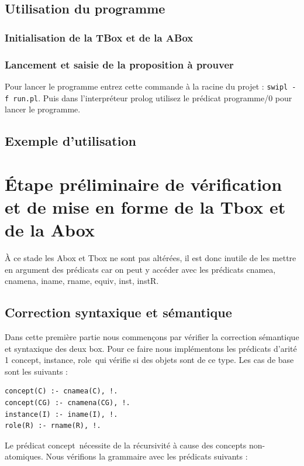 \documentclass{article}
\begin{document}
\subsection{Utilisation du programme}
\subsubsection{Initialisation de la TBox et de la ABox}

\subsubsection{Lancement et saisie de la proposition à prouver}
Pour lancer le programme entrez cette commande à la racine du projet : \verb|swipl -f run.pl|. Puis dans l'interpréteur prolog utilisez le prédicat \color{blue} programme/0 \color{black} pour lancer le programme.


\subsection{Exemple d'utilisation}


\section{\'Etape préliminaire de vérification et de mise en forme de la Tbox et de la Abox}
\`A ce stade les Abox et Tbox ne sont pas altérées, il est donc inutile de les mettre en argument des prédicats car on peut y accéder avec les prédicats \color{blue}cnamea, cnamena, iname, rname, equiv, inst, instR\color{black}.
\subsection{Correction syntaxique et sémantique}
Dans cette première partie nous commençons par vérifier la correction sémantique et syntaxique des deux box. Pour ce faire nous implémentons les prédicats d'arité 1 \color{blue}concept, instance, role\color{black}\ qui vérifie si des objets sont de ce type. Les cas de base sont les suivants :

\begin{verbatim}
concept(C) :- cnamea(C), !.
concept(CG) :- cnamena(CG), !. 
instance(I) :- iname(I), !.
role(R) :- rname(R), !. 
\end{verbatim}

Le prédicat \color{blue}concept\color{black}\ nécessite de la récursivité à cause des concepts non-atomiques. Nous vérifions la grammaire avec les prédicats suivants :
\end{document}

